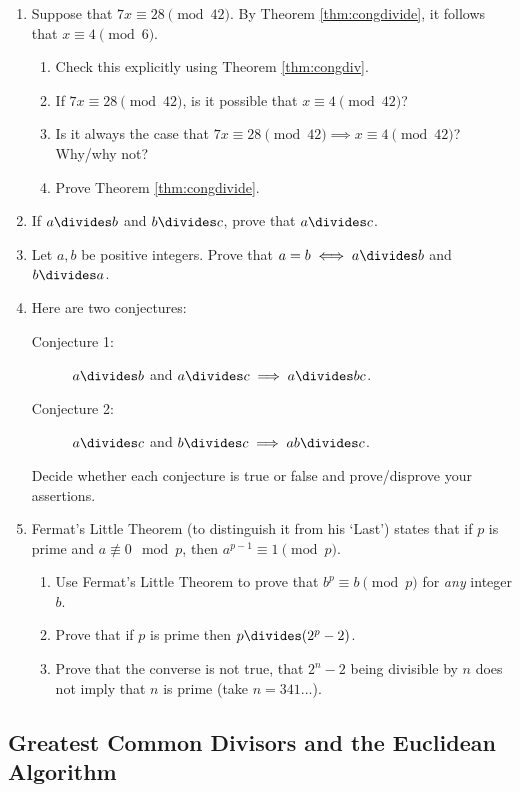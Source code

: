 \begin{enumerate}
  \item\label{ex:thmcongdivide} Suppose that $7x\equiv 28\pmod{42}$. By Theorem \ref{thm:congdivide}, it follows that $x\equiv 4\pmod{6}$.
  \begin{enumerate}
    \item Check this explicitly using Theorem \ref{thm:congdiv}.
    \item If $7x\equiv 28\pmod{42}$, is it possible that $x\equiv 4\pmod{42}$?
    \item Is it always the case that $7x\equiv 28\pmod{42}\implies x\equiv 4\pmod{42}$? Why/why not?
    \item Prove Theorem \ref{thm:congdivide}.
  \end{enumerate}
  
  \item If $a\divides b$ and $b\divides c$, prove that $a\divides c$.
  
  \item\label{ex:adivb} Let $a,b$ be positive integers. Prove that $a=b\iff a\divides b$ and $b\divides a$.
  
  \item Here are two conjectures:
  \begin{description}
    \item[Conjecture 1:] $a\divides b$ and $a\divides c\implies a\divides bc$.
    \item[Conjecture 2:] $a\divides c$ and $b\divides c\implies ab\divides c$.
  \end{description}
 	Decide whether each conjecture is true or false and prove/disprove your assertions.

	\item Fermat's Little Theorem (to distinguish it from his `Last') states that if $p$ is prime and $a\not\equiv 0\mod p$, then $a^{p-1}\equiv 1\pmod p$.
	\begin{enumerate}
	  \item Use Fermat's Little Theorem to prove that $b^p\equiv b\pmod p$ for \emph{any} integer $b$.
	  \item Prove that if $p$ is prime then $p\divides (2^p-2)$.
	  \item Prove that the converse is not true, that $2^n-2$ being divisible by $n$ does not imply that $n$ is prime (take $n=341$...).
	\end{enumerate}
\end{enumerate}\newpage

\subsection{Greatest Common Divisors and the Euclidean Algorithm}


